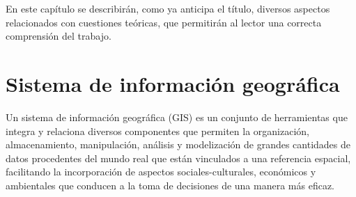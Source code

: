 %	
%
%
%

En este capítulo se describirán, como ya anticipa el título, diversos aspectos relacionados con cuestiones teóricas, que permitirán al lector una correcta comprensión del trabajo.

\section{Sistema de información geográfica}
Un sistema de información geográfica (GIS) \cite{wiki:gis} es un conjunto de herramientas que integra y relaciona diversos componentes que permiten la organización, almacenamiento, manipulación, análisis y modelización de grandes cantidades de datos procedentes del mundo real que están vinculados a una referencia espacial, facilitando la incorporación de aspectos sociales-culturales, económicos y ambientales que conducen a la toma de decisiones de una manera más eficaz.

